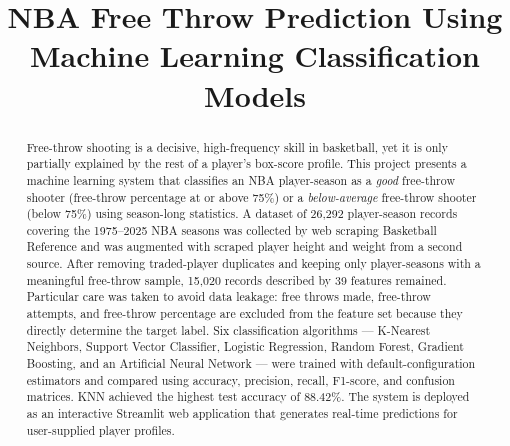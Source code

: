 \documentclass[conference]{IEEEtran}
\begin{document}
\title{NBA Free Throw Prediction Using Machine Learning Classification Models}

\author{



}

\maketitle


\begin{abstract}

Free-throw shooting is a decisive, high-frequency skill in basketball, yet it is only partially explained by the rest of a player's box-score profile. This project presents a machine learning system that classifies an NBA player-season as a \textit{good} free-throw shooter (free-throw percentage at or above 75\%) or a \textit{below-average} free-throw shooter (below 75\%) using season-long statistics. A dataset of 26{,}292 player-season records covering the 1975--2025 NBA seasons was collected by web scraping Basketball Reference and was augmented with scraped player height and weight from a second source. After removing traded-player duplicates and keeping only player-seasons with a meaningful free-throw sample, 15{,}020 records described by 39 features remained. Particular care was taken to avoid data leakage: free throws made, free-throw attempts, and free-throw percentage are excluded from the feature set because they directly determine the target label. Six classification algorithms --- K-Nearest Neighbors, Support Vector Classifier, Logistic Regression, Random Forest, Gradient Boosting, and an Artificial Neural Network --- were trained with default-configuration estimators and compared using accuracy, precision, recall, F1-score, and confusion matrices. KNN achieved the highest test accuracy of 88.42\%. The system is deployed as an interactive Streamlit web application that generates real-time predictions for user-supplied player profiles.

\end{abstract}
\end{document}
